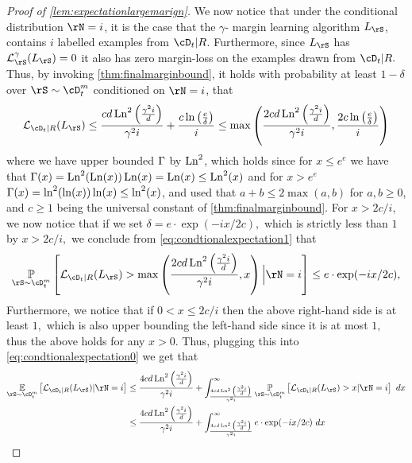 \begin{proof}[Proof of \cref{lem:expectationlargemarign}]
    We now notice that under the conditional distribution $ \rN=i $, it is the case that the $ \gamma $- margin learning algorithm $ L_{\rS} $, contains $ i $ labelled examples from $ \cD_{t}|R $. Furthermore, since $L_{\rS}  $ has     $ \ls_{\rS}^{\gamma}(L_{\rS})=0 $ it also has zero margin-loss on the examples drawn from $ \cD_{t}|R.$ Thus, by invoking \cref{thm:finalmarginbound}, it holds with probability at least $ 1-\delta $ over $ \rS \sim \cD_{t}^{m}$ conditioned on $ \rN=i $, that  
    \begin{align}\label{eq:condtionalexpectation1}
      \ls_{\cD_{t}|R}(L_{\rS})\leq \frac{cd\Ln^{2}\left(\frac{\gamma^{2}i}{d}\right)}{\gamma^{2}i}+ \frac{c\ln{\left(\frac{e}{\delta} \right)}}{i}
      \leq \max\left(\frac{2cd\Ln^{2}\left(\frac{\gamma^{2}i}{d}\right)}{\gamma^{2}i}, \frac{2c\ln{\left(\frac{e}{\delta} \right)}}{i}\right)
    \end{align}  
    where we have upper bounded $ \operatorname{\Gamma} $ by $ \operatorname{\mathrm{Ln}}^{2}$, which holds since for $ x\leq e^{e} $  we have that $\operatorname{\Gamma}(x)= \operatorname{\mathrm{Ln}}^{2}(\operatorname{\mathrm{Ln}}(x))\operatorname{\mathrm{Ln}}(x)=\operatorname{\mathrm{Ln}}(x)\leq \operatorname{\mathrm{Ln}}^{2}(x)$ and for $ x>e^{e} $ $\operatorname{\Gamma}(x)= \ln^{2}(\ln(x))\ln(x)\leq \ln^{2}(x)$, and used that $ a+b\leq 2\max(a,b) $ for $ a,b\geq0 $, and $ c\geq 1$ being the universal constant of \cref{thm:finalmarginbound}. 
    For $ x>2c/i $, we now notice that if we set $ \delta=e\cdot \exp(-ix/2c),$ which is strictly less than $1  $ by $ x>2c/i,$ we conclude from \cref{eq:condtionalexpectation1}  that
    \begin{align*} 
        \p_{\rS\sim \cD^{m}_{t}}\left[\ls_{\cD_{t}|R}(L_{\rS})
        > \max\left(\frac{2cd\Ln^{2}\left(\frac{\gamma^{2}i}{d}\right)}{\gamma^{2}i},x\right)\Big|\rN=i\right]\leq e\cdot \exp(-ix/2c),
      \end{align*}  
    Furthermore, we notice that if $ 0<x\leq 2c/i $ then the above right-hand side is at least $ 1,$ which is also upper bounding the left-hand side since it is at most $ 1,$ thus the above holds for any  $ x>0. $ 
    Thus, plugging this into \cref{eq:condtionalexpectation0} we get that 
    \begin{align*}
        \e_{\rS\sim\cD_{t}^{m}}\left[\ls_{\cD_{t}|R}(L_{\rS})|\rN=i\right]
        &\leq \frac{4cd\Ln^{2}{\left( \frac{\gamma^{2}i}{d}\right)}}{\gamma^{2}i}+\int_{\frac{4cd\Ln^{2}{\left( \frac{\gamma^{2}i}{d}\right)}}{\gamma^{2}i}}^{\infty} \p_{\rS\sim\cD^{m}_{t}}\left[\ls_{\cD_{t}|R}(L_{\rS})> x|\rN=i \right] \ dx
        \\
        &\leq \frac{4cd\Ln^{2}{\left( \frac{\gamma^{2}i}{d}\right)}}{\gamma^{2}i}+\int_{\frac{4cd\Ln^{2}{\left( \frac{\gamma^{2}i}{d}\right)}}{\gamma^{2}i}}^{\infty} e\cdot \exp(-ix/2c) \ dx 

\end{align*}
\end{proof}
